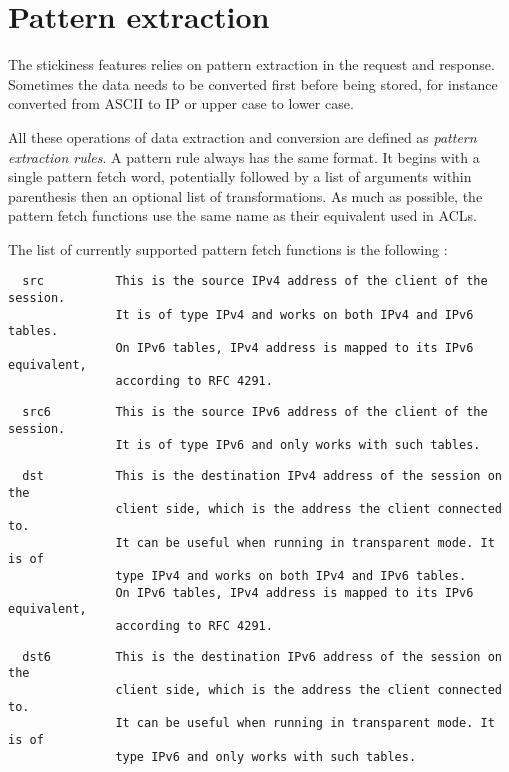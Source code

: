 
\section{Pattern extraction}

The stickiness features relies on pattern extraction in the request and
response. Sometimes the data needs to be converted first before being stored,
for instance converted from ASCII to IP or upper case to lower case.


All these operations of data extraction and conversion are defined as
\emph{pattern extraction rules}. A pattern rule always has the same format. It
begins with a single pattern fetch word, potentially followed by a list of
arguments within parenthesis then an optional list of transformations. As
much as possible, the pattern fetch functions use the same name as their
equivalent used in ACLs.


The list of currently supported pattern fetch functions is the following :

\begin{verbatim}
  src          This is the source IPv4 address of the client of the session.
               It is of type IPv4 and works on both IPv4 and IPv6 tables.
               On IPv6 tables, IPv4 address is mapped to its IPv6 equivalent,
               according to RFC 4291.
\end{verbatim}

\begin{verbatim}
  src6         This is the source IPv6 address of the client of the session.
               It is of type IPv6 and only works with such tables.
\end{verbatim}

\begin{verbatim}
  dst          This is the destination IPv4 address of the session on the
               client side, which is the address the client connected to.
               It can be useful when running in transparent mode. It is of
               type IPv4 and works on both IPv4 and IPv6 tables.
               On IPv6 tables, IPv4 address is mapped to its IPv6 equivalent,
               according to RFC 4291.
\end{verbatim}

\begin{verbatim}
  dst6         This is the destination IPv6 address of the session on the
               client side, which is the address the client connected to.
               It can be useful when running in transparent mode. It is of
               type IPv6 and only works with such tables.
\end{verbatim}

